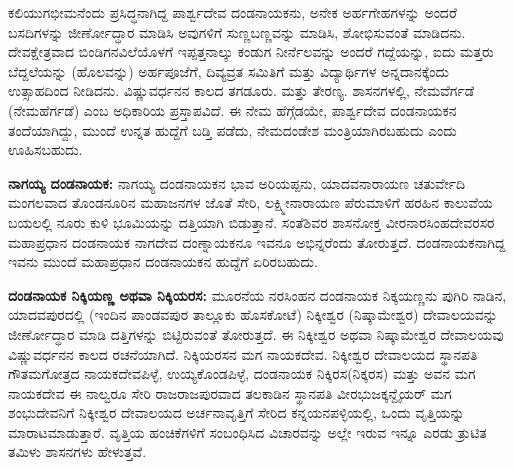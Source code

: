 \newpage

ಕಲಿಯುಗಭೀಮನೆಂದು ಪ್ರಸಿದ್ಧನಾಗಿದ್ದ ಪಾರ್ಶ್ವದೇವ ದಂಡನಾಯಕನು, ಅನೇಕ ಅರ್ಹಗೇಹಗಳನ್ನು ಅಂದರೆ ಬಸದಿ\-ಗಳನ್ನು ಜೀರ್ಣೋದ್ಧಾರ ಮಾಡಿಸಿ ಅವುಗಳಿಗೆ ಸುಣ್ಣಬಣ್ಣವನ್ನು ಮಾಡಿಸಿ, ಶೋಭಿಸುವಂತೆ ಮಾಡಿದನು. ದೇವಕ್ಷೇತ್ರವಾದ ಬಿಂಡಿಗನವಿಲೆಯೊಳಗೆ ಇಪ್ಪತ್ತನಾಲ್ಕು ಕಂಡುಗ ನೀರ್ನೆಲವನ್ನು ಅಂದರೆ ಗದ್ದೆಯನ್ನು, ಐದು ಮತ್ತರು ಬೆದ್ದಲೆಯನ್ನು (ಹೊಲವನ್ನು) ಅರ್ಹಪೂಜೆಗೆ, ದಿವ್ಯವ್ರತ ಸಮಿತಿಗೆ ಮತ್ತು ವಿದ್ಯಾರ್ಥಿಗಳ ಅನ್ನದಾನಕ್ಕೆಂದು ಉತ್ಸಾಹದಿಂದ ನೀಡಿದನು. ವಿಷ್ಣುವರ್ಧನನ ಕಾಲದ ತಗಡೂರು. ಮತ್ತು ತೇರಣ್ಯ. ಶಾಸನಗಳಲ್ಲಿ, ನೇಮವೆರ್ಗಡೆ (ನೇಮಹೆರ್ಗಡೆ) ಎಂಬ ಅಧಿಕಾರಿಯ ಪ್ರಸ್ತಾಪವಿದೆ. ಈ ನೇಮ ಹೆಗ್ಗೆಡಯೇ, ಪಾರ್ಶ್ವದೇವ ದಂಡನಾಯಕನ ತಂದೆಯಾಗಿದ್ದು, ಮುಂದೆ ಉನ್ನತ ಹುದ್ದೆಗೆ ಬಡ್ತಿ ಪಡೆದು, ನೇಮದಂಡೇಶ ಮಂತ್ರಿಯಾಗಿರಬಹುದು ಎಂದು ಊಹಿಸಬಹುದು.

\textbf{ನಾಗಯ್ಯ ದಂಡನಾಯಕ:} ನಾಗಯ್ಯ ದಂಡನಾಯಕನ ಭಾವ ಅರಿಯಪ್ಪನು, ಯಾದವನಾರಾಯಣ ಚತುರ್ವೇದಿ ಮಂಗಲವಾದ ತೊಂಡನೂರಿನ ಮಹಾಜನಗಳ ಜೊತೆ ಸೇರಿ, ಲಕ್ಷ್ಮೀನಾರಾಯಣ ಪೆರುಮಾಳಿಗೆ ಹರಹಿನ ಕಾಲುವೆಯ ಬಯಲಲ್ಲಿ ನೂರು ಕುಳಿ ಭೂಮಿಯನ್ನು ದತ್ತಿಯಾಗಿ ಬಿಡುತ್ತಾನೆ. ಸಂತೆಶಿವರ ಶಾಸನೋಕ್ತ ವೀರನಾರಸಿಂಹದೇವರಸರ ಮಹಾಪ್ರಧಾನ ದಂಡನಾಯಕ ನಾಗದೇವ ದಂಣ್ನಾಯಕನೂ ಇವನೂ ಅಭಿನ್ನರೆಂದು ತೋರುತ್ತದೆ. ದಂಡನಾಯಕನಾಗಿದ್ದ ಇವನು ಮುಂದೆ ಮಹಾಪ್ರಧಾನ ದಂಡನಾಯಕನ ಹುದ್ದೆಗೆ ಏರಿರಬಹುದು.

\textbf{ದಂಡನಾಯಕ ನಿಕ್ಕಿಯಣ್ಣ ಅಥವಾ ನಿಕ್ಕಿಯರಸ:} ಮೂರನೆಯ ನರಸಿಂಹನ ದಂಡನಾಯಕ ನಿಕ್ಕಯಣ್ಣನು ಪುಗಿರಿ ನಾಡಿನ, ಯಾದವಪುರದಲ್ಲಿ (ಇಂದಿನ ಪಾಂಡವಪುರ ತಾಲ್ಲೂಕು ಹೊಸಕೋಟೆ) ನಿಕ್ಕೀಶ್ವರ (ನಿಷ್ಕಾಮೇಶ್ವರ) ದೇವಾಲಯವನ್ನು ಜೀರ್ಣೋದ್ಧಾರ ಮಾಡಿ ದತ್ತಿಗಳನ್ನು ಬಿಟ್ಟಿರುವಂತೆ ತೋರುತ್ತದೆ. ಈ ನಿಕ್ಕೀಶ್ವರ ಅಥವಾ ನಿಷ್ಕಾಮೇಶ್ವರ ದೇವಾಲಯವು ವಿಷ್ಣುವರ್ಧನನ ಕಾಲದ ರಚನೆಯಾಗಿದೆ. ನಿಕ್ಕಿಯರಸನ ಮಗ ನಾಯಕದೇವ. ನಿಕ್ಕೀಶ್ವರ ದೇವಾಲಯದ ಸ್ಥಾನಪತಿ ಗೌತಮಗೋತ್ರದ ನಾಯಕದೇವಪಿಳ್ಳೆ, ಉಯ್ಯಕೊಂಡಪಿಳ್ಳೆ, ದಂಡನಾಯಕ ನಿಕ್ಕಿರಸ(ನಿಕ್ಕರಸ) ಮತ್ತು ಅವನ ಮಗ ನಾಯಕದೇವ ಈ ನಾಲ್ವರೂ ಸೇರಿ ರಾಜರಾಜಪುರ\-ವಾದ ತಲಕಾಡಿನ ಸ್ಥಾನಪತಿ ವೀರಭುಜಕ್ಕನ್ದೈಯರ್​ ಮಗ ಶಂಭುದೇವನಿಗೆ ನಿಕ್ಕೀಶ್ವರ ದೇವಾಲಯದ ಅರ್ಚನಾವೃತ್ತಿಗೆ ಸೇರಿದ ಕನ್ನಯನಪಳ್ಳಿಯಲ್ಲಿ, ಒಂದು ವೃತ್ತಿಯನ್ನು ಮಾರಾಟಮಾಡುತ್ತಾರೆ. ವೃತ್ತಿಯ ಹಂಚಿಕೆಗಳಿಗೆ ಸಂಬಂಧಿಸಿದ ವಿಚಾರವನ್ನು ಅಲ್ಲೇ ಇರುವ ಇನ್ನೂ ಎರಡು ತ್ರುಟಿತ ತಮಿಳು ಶಾಸನಗಳು ಹೇಳುತ್ತವೆ.

